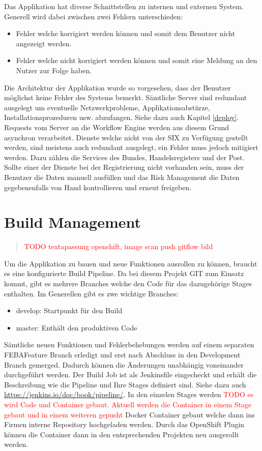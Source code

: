 Das Applikation hat diverse Schnittstellen zu internen und externen System. Generell wird dabei zwischen zwei Fehlern unterschieden:
\begin{itemize}
	\item Fehler welche korrigiert werden können und somit dem Benutzer nicht angezeigt werden.
	\item Fehler welche nicht korrigiert werden können und somit eine Meldung an den Nutzer zur Folge haben.
\end{itemize}
Die Architektur der Applikation wurde so vorgesehen, dass der Benutzer möglichst keine Fehler des Systems bemerkt. Sämtliche Server sind redundant ausgelegt um eventuelle Netzwerkprobleme, Applikationsabstürze, Installationsprozeduren usw. abzufangen. Siehe dazu auch Kapitel \ref{deploy}. Requests vom Server an die Workflow Engine werden aus diesem Grund asynchron verarbeitet.\newline
Dienste welche nicht von der SIX zu Verfügung gestellt werden, sind meistens auch redundant ausgelegt, ein Fehler muss jedoch mitigiert werden. Dazu zählen die Services des Bundes, Handelsregisters und der Post. Sollte einer der Dienste bei der Registrierung nicht vorhanden sein, muss der Benutzer die Daten manuell ausfüllen und das Risk Management die Daten gegebenenfalls von Hand kontrollieren und erneut freigeben.

\section{Build Management}
\begin{quote}
  \textcolor{red}{TODO textapassung openshift, image scan push gitflow bild}
\end{quote}

Um die Applikation zu bauen und neue Funktionen ausrollen zu können, braucht es eine konfigurierte Build Pipeline. Da bei diesem Projekt GIT zum Einsatz kommt, gibt es mehrere Branches welche den Code für das dazugehörige Stages enthalten. Im Generellen gibt es zwe wichtige Branches:
\begin{itemize}
	\item develop: Startpunkt für den Build
	\item master: Enthält den produktiven Code
\end{itemize}
Sämtliche neuen Funktionen und Fehlerbehebungen werden auf einem separaten \Gls{FEBA}Feature Branch erledigt und erst nach Abschluss in den Development Branch gemerged. Dadurch können die Änderungen unabhängig voneinander durchgeführt werden.\newline
Der Build Job ist als Jenkinsfile eingecheckt und erhält die Beschreibung wie die Pipeline und Ihre Stages definiert sind. Siehe dazu auch \url{https://jenkins.io/doc/book/pipeline/}. In den einzelen Stages werden \textcolor{red}{TODO es wird Code und Container gebaut. Aktuell werden die Container in einem Stage gebaut und in einem weiteren gepusht} Docker Container gebaut welche dann ins Firmen interne Repository hochgeladen werden. Durch das OpenShift Plugin können die Container dann in den entsprechenden Projekten neu ausgerollt werden.

